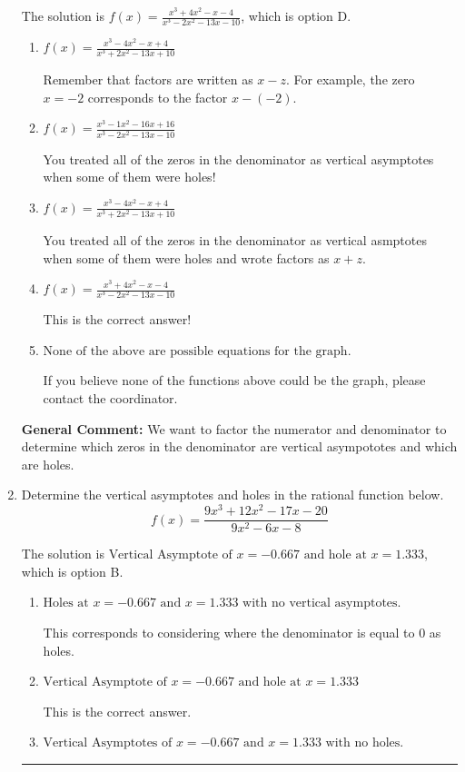 \documentclass{extbook}[14pt]
\newcommand{\litem}[1]{\item #1

\rule{\textwidth}{0.4pt}}
\begin{document}
\begin{enumerate}
{The solution is \( f(x)=\frac{x^{3} +4 x^{2} -x -4}{x^{3} -2 x^{2} -13 x -10} \), which is option D.\begin{enumerate}[label=\Alph*.]
\item \( f(x)=\frac{x^{3} -4 x^{2} -x + 4}{x^{3} +2 x^{2} -13 x + 10} \)

Remember that factors are written as $x-z$. For example, the zero $x=-2$ corresponds to the factor $x-(-2)$.
\item \( f(x)=\frac{x^{3} -1 x^{2} -16 x + 16}{x^{3} -2 x^{2} -13 x -10} \)

You treated all of the zeros in the denominator as vertical asymptotes when some of them were holes!
\item \( f(x)=\frac{x^{3} -4 x^{2} -x + 4}{x^{3} +2 x^{2} -13 x + 10} \)

You treated all of the zeros in the denominator as vertical asmptotes when some of them were holes and wrote factors as $x+z$.
\item \( f(x)=\frac{x^{3} +4 x^{2} -x -4}{x^{3} -2 x^{2} -13 x -10} \)

This is the correct answer!
\item \( \text{None of the above are possible equations for the graph.} \)

If you believe none of the functions above could be the graph, please contact the coordinator.
\end{enumerate}

\textbf{General Comment:} We want to factor the numerator and denominator to determine which zeros in the denominator are vertical asympototes and which are holes.
}
\litem{
Determine the vertical asymptotes and holes in the rational function below.
\[ f(x) = \frac{9x^{3} +12 x^{2} -17 x -20}{9x^{2} -6 x -8} \]

The solution is \( \text{Vertical Asymptote of } x = -0.667 \text{ and hole at } x = 1.333 \), which is option B.\begin{enumerate}[label=\Alph*.]
\item \( \text{Holes at } x = -0.667 \text{ and } x = 1.333 \text{ with no vertical asymptotes.} \)

This corresponds to considering where the denominator is equal to 0 as holes.
\item \( \text{Vertical Asymptote of } x = -0.667 \text{ and hole at } x = 1.333 \)

This is the correct answer.
\item \( \text{Vertical Asymptotes of } x = -0.667 \text{ and } x = 1.333 \text{ with no holes.} \)


\end{enumerate}}
\end{enumerate}
\end{document}
